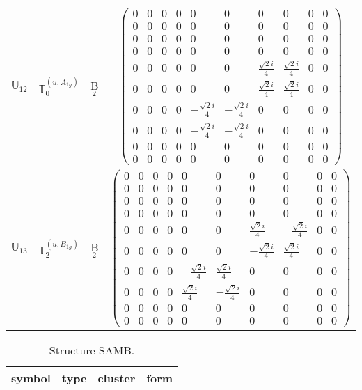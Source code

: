 \documentclass[fleqn,10pt,landscape]{article}
\begin{document}
\begin{itemize}
\begin{center}
\begin{longtable}{c|c|c|c}
$ \mathbb{U}_{12} $ & $\mathbb{T}_{0}^{(u,A_{1g})}$ & B$_{2}$ & $\begin{pmatrix} 0 & 0 & 0 & 0 & 0 & 0 & 0 & 0 & 0 & 0 \\ 0 & 0 & 0 & 0 & 0 & 0 & 0 & 0 & 0 & 0 \\ 0 & 0 & 0 & 0 & 0 & 0 & 0 & 0 & 0 & 0 \\ 0 & 0 & 0 & 0 & 0 & 0 & 0 & 0 & 0 & 0 \\ 0 & 0 & 0 & 0 & 0 & 0 & \frac{\sqrt{2} i}{4} & \frac{\sqrt{2} i}{4} & 0 & 0 \\ 0 & 0 & 0 & 0 & 0 & 0 & \frac{\sqrt{2} i}{4} & \frac{\sqrt{2} i}{4} & 0 & 0 \\ 0 & 0 & 0 & 0 & - \frac{\sqrt{2} i}{4} & - \frac{\sqrt{2} i}{4} & 0 & 0 & 0 & 0 \\ 0 & 0 & 0 & 0 & - \frac{\sqrt{2} i}{4} & - \frac{\sqrt{2} i}{4} & 0 & 0 & 0 & 0 \\ 0 & 0 & 0 & 0 & 0 & 0 & 0 & 0 & 0 & 0 \\ 0 & 0 & 0 & 0 & 0 & 0 & 0 & 0 & 0 & 0 \end{pmatrix}$ \\
$ \mathbb{U}_{13} $ & $\mathbb{T}_{2}^{(u,B_{1g})}$ & B$_{2}$ & $\begin{pmatrix} 0 & 0 & 0 & 0 & 0 & 0 & 0 & 0 & 0 & 0 \\ 0 & 0 & 0 & 0 & 0 & 0 & 0 & 0 & 0 & 0 \\ 0 & 0 & 0 & 0 & 0 & 0 & 0 & 0 & 0 & 0 \\ 0 & 0 & 0 & 0 & 0 & 0 & 0 & 0 & 0 & 0 \\ 0 & 0 & 0 & 0 & 0 & 0 & \frac{\sqrt{2} i}{4} & - \frac{\sqrt{2} i}{4} & 0 & 0 \\ 0 & 0 & 0 & 0 & 0 & 0 & - \frac{\sqrt{2} i}{4} & \frac{\sqrt{2} i}{4} & 0 & 0 \\ 0 & 0 & 0 & 0 & - \frac{\sqrt{2} i}{4} & \frac{\sqrt{2} i}{4} & 0 & 0 & 0 & 0 \\ 0 & 0 & 0 & 0 & \frac{\sqrt{2} i}{4} & - \frac{\sqrt{2} i}{4} & 0 & 0 & 0 & 0 \\ 0 & 0 & 0 & 0 & 0 & 0 & 0 & 0 & 0 & 0 \\ 0 & 0 & 0 & 0 & 0 & 0 & 0 & 0 & 0 & 0 \end{pmatrix}$ \\
\end{longtable}
\end{center}
\begin{center}
\renewcommand{\arraystretch}{1.3}
\begin{longtable}{c|c|c|c}
\caption{Structure SAMB.}
 \\
 \hline \hline
symbol & type & cluster & form \\ \hline \endfirsthead


\end{longtable}
\end{center}
\end{itemize}
\end{document}
